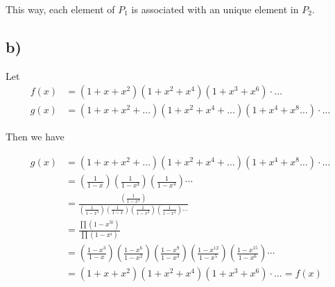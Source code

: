 \documentclass[a4paper,11pt]{report}
\begin{document}
This way, each element of $P_1$ is associated with an unique element in $P_2$.

\subsection*{b)}

Let
\begin{align*}
  f(x) &= (1+x+x^2)(1+x^2+x^4)(1+x^3+x^6)\cdot\dots \\
  g(x) &= (1+x+x^2+\dots)(1+x^2+x^4+\dots)(1+x^4+x^8\dots)\cdot\dots
\end{align*}

Then we have

\begin{align*}
  g(x) &= (1+x+x^2+\dots)(1+x^2+x^4+\dots)(1+x^4+x^8\dots)\cdot\dots \\
       &= (\frac{1}{1-x})(\frac{1}{1-x²})(\frac{1}{1-x^4})\cdots\\
       &= \frac{(\frac{1}{1-x^3})}{(\frac{1}{1-x^3})(\frac{1}{1-x})(\frac{1}{1-x^2})(\frac{1}{1-x^4})\cdots}\\
       &= \frac{\prod (1-x^{3i})}{\prod (1-x^i)}\\
       &= (\frac{1-x^3}{1-x})(\frac{1-x^6}{1-x^2})(\frac{1-x^9}{1-x^3})(\frac{1-x^{12}}{1-x^5})(\frac{1-x^{15}}{1-x^6})\cdots\\
       &= (1+x+x^2)(1+x^2+x^4)(1+x^3+x^6)\cdot\dots = f(x)\\
\end{align*}
\end{document}
